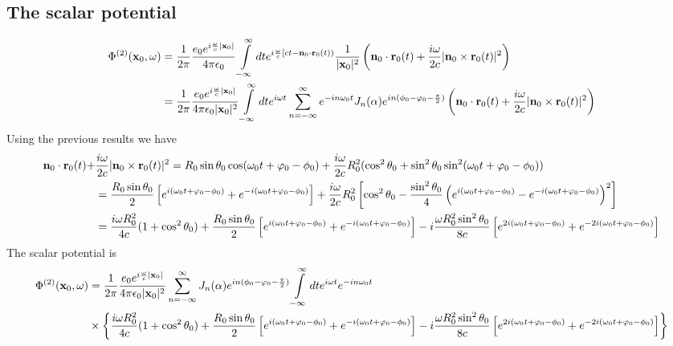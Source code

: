 \subsection{The scalar potential}
\begin{align}
    \Phi^{(2)}({\bf x}_0,\omega) & =\frac1{2\pi}\frac{e_0 e^{i\frac{\omega}c|{\bf x}_0|}}{4\pi\epsilon_0}\int\limits_{-\infty}^{\infty}dte^{i\frac{\omega}c\left[ct-{\bf n}_0\cdot{\bf r}_0(t)\right)} \frac1{|{\bf x}_0|^2}\left({{\bf n}_0\cdot{\bf r}_0(t)}+\frac{i\omega}{2c}{|{\bf n}_0\times{\bf r}_0(t)|^2} \right)\nonumber                                   \\
                                 & =\frac1{2\pi}\frac{e_0 e^{i\frac{\omega}c|{\bf x}_0|}}{4\pi\epsilon_0|{\bf x}_0|^2}\int\limits_{-\infty}^{\infty}dte^{i\omega t}\sum\limits_{n=-\infty}^{\infty} e^{-i n \omega_0 t}J_n(\alpha) e^{in(\phi_0-\varphi_0-\frac{\pi}2)}\left({{\bf n}_0\cdot{\bf r}_0(t)}+\frac{i\omega}{2c}{|{\bf n}_0\times{\bf r}_0(t)|^2} \right)
\end{align}
Using the previous results we have
\begin{align}
    {{\bf n}_0\cdot{\bf r}_0(t)}+ & \frac{i\omega}{2c}{|{\bf n}_0\times{\bf r}_0(t)|^2}  =R_0\sin\theta_0\cos(\omega_0 t+\varphi_0-\phi_0)+\frac{i\omega}{2c}R_0^2(\cos^2\theta_0+\sin^2\theta_0\sin^2(\omega_0 t+\varphi_0-\phi_0))\nonumber                                                                                         \\
                                  & =\frac{R_0\sin\theta_0}2\left[e^{i(\omega_0 t+\varphi_0-\phi_0)}+e^{-i(\omega_0 t+\varphi_0-\phi_0)}\right]+\frac{i\omega}{2c}R_0^2\left[\cos^2\theta_0-\frac{\sin^2\theta_0}4\left(e^{i(\omega_0 t+\varphi_0-\phi_0)}-e^{-i(\omega_0 t+\varphi_0-\phi_0)}\right)^2\right]\nonumber               \\
                                  & = \frac{i\omega R_0^2}{4c}(1+\cos^2\theta_0)+\frac{R_0\sin\theta_0}{2}\left[e^{i(\omega_0 t+\varphi_0-\phi_0)}+e^{-i(\omega_0 t+\varphi_0-\phi_0)}\right]  -i\frac{\omega R_0^2 \sin^2\theta_0}{8c}\left[e^{2i(\omega_0 t+\varphi_0-\phi_0)}+e^{-2i(\omega_0 t+\varphi_0-\phi_0)}\right]\nonumber
\end{align}
The scalar potential is
\begin{align}
    \Phi^{(2)}({\bf x}_0,\omega) & =\frac1{2\pi}\frac{e_0 e^{i\frac{\omega}c|{\bf x}_0|}}{4\pi\epsilon_0|{\bf x}_0|^2}\sum\limits_{n=-\infty}^{\infty} J_n(\alpha) e^{in(\phi_0-\varphi_0-\frac{\pi}2)}\int\limits_{-\infty}^{\infty} dt e^{i\omega t} e^{-i n \omega_0 t}                                                                              \\
                                 & \times\left\{\frac{i\omega R_0^2}{4c}(1+\cos^2\theta_0)+\frac{R_0\sin\theta_0}{2}\left[e^{i(\omega_0 t+\varphi_0-\phi_0)}+e^{-i(\omega_0 t+\varphi_0-\phi_0)}\right]  -i\frac{\omega R_0^2 \sin^2\theta_0}{8c}\left[e^{2i(\omega_0 t+\varphi_0-\phi_0)}+e^{-2i(\omega_0 t+\varphi_0-\phi_0)}\right]\right\}\nonumber
\end{align}
